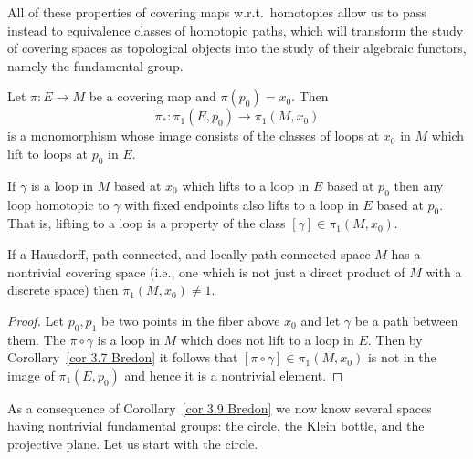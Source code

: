 All of these properties of covering maps w.r.t.\ homotopies allow us to pass instead to equivalence classes of homotopic paths, which will transform the study of covering spaces as topological objects into the study of their algebraic functors, namely the fundamental group. 
\begin{cor}\label{cor 3.7 Bredon}
    Let $\pi:E\to M$ be a covering map and $\pi(p_0)=x_0$. Then \[\pi_\ast : \pi_1(E,p_0)\to \pi_1(M,x_0)\] is a monomorphism whose image consists of the classes of loops at $x_0$ in $M$ which lift to loops at $p_0$ in $E$.
\end{cor}
\begin{cor}
    If $\gamma$ is a loop in $M$ based at $x_0$ which lifts to a loop in $E$ based at $p_0$ then any loop homotopic to $\gamma$ with fixed endpoints also lifts to a loop in $E$ based at $p_0$.  That is, lifting to a loop is a property of the class $[\gamma]\in\pi_1(M,x_0)$.
\end{cor}
\begin{cor}\label{cor 3.9 Bredon}
    If a Hausdorff, path-connected, and locally path-connected space $M$ has a nontrivial covering space (i.e., one which is not just a direct product of $M$ with a discrete space) then $\pi_1(M,x_0)\neq 1$.
\end{cor}
\begin{proof}
    Let $p_0,p_1$ be two points in the fiber above $x_0$ and let $\gamma $ be a path between them. The  $\pi\circ \gamma$ is a loop in $M$ which does not lift to a loop in $E$. Then  by Corollary~\ref{cor 3.7 Bredon} it follows that $[\pi\circ \gamma]\in\pi_1(M,x_0)$ is not in the image of $\pi_1(E,p_0)$ and hence it is a nontrivial element.
\end{proof}

As a consequence of Corollary~\ref{cor 3.9 Bredon} we now know several spaces having nontrivial fundamental groups: the circle, the Klein bottle, and the projective plane. Let us start with the circle.

